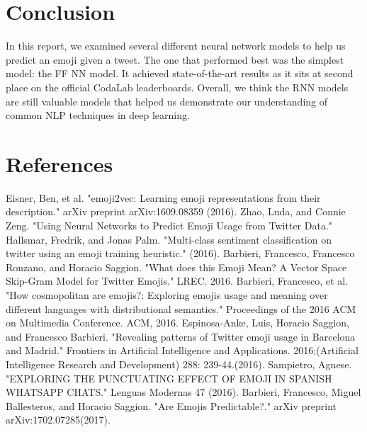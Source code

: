 \documentclass[11pt,a4paper]{article}
\begin{document}
\section{Conclusion}
	In this report, we examined several different neural network models to help us predict an emoji given a tweet. The one that performed best was the simplest model: the FF NN model. It achieved state-of-the-art results as it sits at second place on the official CodaLab leaderboards. Overall, we think the RNN models are still valuable models that helped us demonstrate our understanding of common NLP techniques in deep learning.
	
	\section{References}
	Eisner, Ben, et al. "emoji2vec: Learning emoji representations from their description." arXiv preprint arXiv:1609.08359 (2016).
	\newline
		\newline
	Zhao, Luda, and Connie Zeng. "Using Neural Networks to Predict Emoji Usage from Twitter Data."
		\newline
		\newline
	Hallsmar, Fredrik, and Jonas Palm. "Multi-class sentiment classification on twitter using an emoji training heuristic." (2016).
		\newline
		\newline
	Barbieri, Francesco, Francesco Ronzano, and Horacio Saggion. "What does this Emoji Mean? A Vector Space Skip-Gram Model for Twitter Emojis." LREC. 2016.
		\newline
		\newline
	Barbieri, Francesco, et al. "How cosmopolitan are emojis?: Exploring emojis usage and meaning over different languages with distributional semantics." Proceedings of the 2016 ACM on Multimedia Conference. ACM, 2016.
		\newline
		\newline
	Espinosa-Anke, Luis, Horacio Saggion, and Francesco Barbieri. "Revealing patterns of Twitter emoji usage in Barcelona and Madrid." Frontiers in Artificial Intelligence and Applications. 2016;(Artificial Intelligence Research and Development) 288: 239-44.(2016).
		\newline
		\newline
	Sampietro, Agnese. "EXPLORING THE PUNCTUATING EFFECT OF EMOJI IN SPANISH WHATSAPP CHATS." Lenguas Modernas 47 (2016).
		\newline
		\newline
	Barbieri, Francesco, Miguel Ballesteros, and Horacio Saggion. "Are Emojis Predictable?." arXiv preprint arXiv:1702.07285(2017).
	
%	
%	
	
	\appendix
	
	
	
\end{document}
